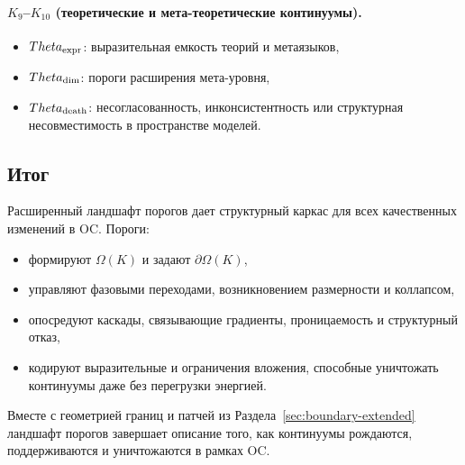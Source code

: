 \paragraph{\texorpdfstring{\(K_9\)}{K_9}–\(K_{10}\) (теоретические и мета-теоретические континуумы).}
\begin{itemize}
    \item \(\Theta_{\rm expr}\): выразительная емкость теорий и
          метаязыков,
    \item \(\Theta_{\rm dim}\): пороги расширения мета-уровня,
    \item \(\Theta_{\rm death}\): несогласованность, инконсистентность или структурная
          несовместимость в пространстве моделей.
\end{itemize}

\subsection{Итог}

Расширенный ландшафт порогов дает структурный каркас для всех
качественных изменений в OC. Пороги:
\begin{itemize}
    \item формируют \(\Omega(K)\) и задают \(\partial\Omega(K)\),
    \item управляют фазовыми переходами, возникновением размерности и коллапсом,
    \item опосредуют каскады, связывающие градиенты, проницаемость и структурный
          отказ,
    \item кодируют выразительные и ограничения вложения, способные уничтожать
          континуумы даже без перегрузки энергией.
\end{itemize}

Вместе с геометрией границ и патчей из
Раздела~\ref{sec:boundary-extended} ландшафт порогов завершает
описание того, как континуумы рождаются, поддерживаются и уничтожаются в рамках
OC.


